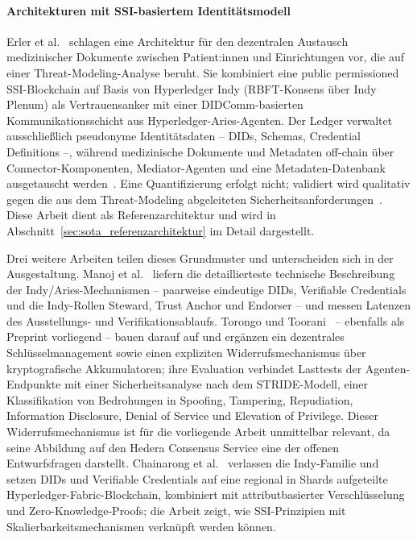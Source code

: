 \paragraph{Architekturen mit SSI-basiertem Identitätsmodell}
\label{par:literatur_ssi}

Erler et al.~\cite{erler2023} schlagen eine Architektur für den dezentralen Austausch medizinischer Dokumente zwischen Patient:innen und Einrichtungen vor, die auf einer Threat-Modeling-Analyse beruht. Sie kombiniert eine public permissioned SSI-Blockchain auf Basis von Hyperledger Indy (RBFT-Konsens über Indy Plenum) als Vertrauensanker mit einer DIDComm-basierten Kommunikationsschicht aus Hyperledger-Aries-Agenten. Der Ledger verwaltet ausschließlich pseudonyme Identitätsdaten -- DIDs, Schemas, Credential Definitions --, während medizinische Dokumente und Metadaten off-chain über Connector-Komponenten, Mediator-Agenten und eine Metadaten-Datenbank ausgetauscht werden~\cite{erler2023}. Eine Quantifizierung erfolgt nicht; validiert wird qualitativ gegen die aus dem Threat-Modeling abgeleiteten Sicherheitsanforderungen~\cite{erler2023}. Diese Arbeit dient als Referenzarchitektur und wird in Abschnitt~\ref{sec:sota_referenzarchitektur} im Detail dargestellt.

Drei weitere Arbeiten teilen dieses Grundmuster und unterscheiden sich in der Ausgestaltung. Manoj et al.~\cite{manoj2022} liefern die detaillierteste technische Beschreibung der Indy/Aries-Mechanismen -- paarweise eindeutige DIDs, Verifiable Credentials und die Indy-Rollen Steward, Trust Anchor und Endorser -- und messen Latenzen des Ausstellungs- und Verifikationsablaufs. Torongo und Toorani~\cite{torongo2023} -- ebenfalls als Preprint vorliegend -- bauen darauf auf und ergänzen ein dezentrales Schlüsselmanagement sowie einen expliziten Widerrufsmechanismus über kryptografische Akkumulatoren; ihre Evaluation verbindet Lasttests der Agenten-Endpunkte mit einer Sicherheitsanalyse nach dem STRIDE-Modell, einer Klassifikation von Bedrohungen in Spoofing, Tampering, Repudiation, Information Disclosure, Denial of Service und Elevation of Privilege. Dieser Widerrufsmechanismus ist für die vorliegende Arbeit unmittelbar relevant, da seine Abbildung auf den Hedera Consensus Service eine der offenen Entwurfsfragen darstellt. Chainarong et al.~\cite{chainarong2025} verlassen die Indy-Familie und setzen DIDs und Verifiable Credentials auf eine regional in Shards aufgeteilte Hyperledger-Fabric-Blockchain, kombiniert mit attributbasierter Verschlüsselung und Zero-Knowledge-Proofs; die Arbeit zeigt, wie SSI-Prinzipien mit Skalierbarkeitsmechanismen verknüpft werden können.

